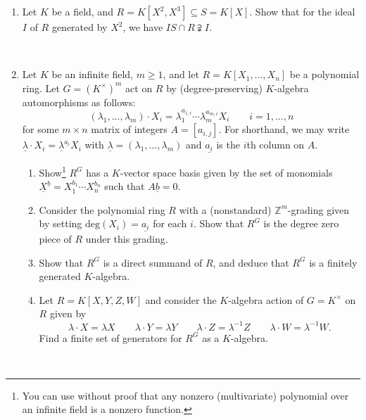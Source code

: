 \documentclass[12pt]{amsart}
\begin{document}
\begin{enumerate}



\item Let $K$ be a field, and $R=K[X^2,X^3] \subseteq S=K[X]$. Show that for the ideal $I$ of $R$ generated by $X^2$, we have $I S \cap R \supsetneqq I$. %

\

\item Let $K$ be an infinite field, $m \geqslant 1$, and let $R = K[X_1,\dots, X_n]$ be a polynomial ring. Let $G= (K^\times)^m$ act on $R$ by (degree-preserving) $K$-algebra automorphisms as follows: 
\[ 
 (\lambda_1,\dots,\lambda_m) \cdot X_i = \lambda_1^{a_{1,i}} \cdots  \lambda_m^{a_{m,i}} X_i \qquad  {i=1,\dots,n} 
 \]
 for some $m \times n$ matrix of integers $A=[a_{i,j}]$. For shorthand, we may write $\underline{\lambda} \cdot X_i = \underline{\lambda}^{\underline{a_i}} X_i$ with $\underline{\lambda} = (\lambda_1,\dots,\lambda_m)$ and $\underline{a_i}$ is the $i$th column on $A$.
\begin{enumerate}
\item Show\footnote{You can use without proof that any nonzero (multivariate) polynomial over an infinite field is a nonzero function.} $R^G$ has a $K$-vector space basis given by the set of monomials $\underline{X}^{\underline{b} }= X_1^{b_1} \cdots X_n^{b_n}$ such that $A\underline{b}=0$.
\item Consider the polynomial ring $R$ with a (nonstandard) $\mathbb{Z}^m$-grading given by setting $\textrm{deg}(X_i) = \underline{a_i}$
for each $i$. Show that $R^G$ is the degree zero piece of $R$ under this grading.
\item Show that $R^G$ is a direct summand of $R$, and deduce that $R^G$ is a finitely generated $K$-algebra.
\item Let $R = K[X,Y,Z,W]$ and consider the $K$-algebra action of $G = K^\times$ on $R$ given by
\[\lambda \cdot X = \lambda X \qquad \lambda \cdot Y = \lambda Y \qquad \lambda \cdot Z = \lambda^{-1} Z \qquad \lambda \cdot W = \lambda^{-1} W.\]
Find a finite set of generators for $R^G$ as a $K$-algebra.
\end{enumerate}

\


\end{enumerate}
\end{document}
